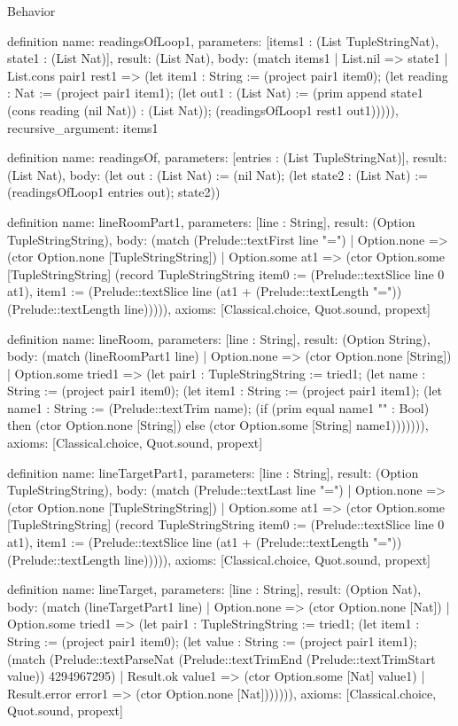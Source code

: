 \begin{lexlean}{Behavior}
\begin{semanticmodule}
definition{
  name: readingsOfLoop1,
  parameters: [items1 : (List TupleStringNat), state1 : (List Nat)],
  result: (List Nat),
  body: (match items1
    | List.nil => state1
    | List.cons pair1 rest1 => (let item1 : String := (project pair1 item0); (let reading : Nat := (project pair1 item1); (let out1 : (List Nat) := (prim append state1 (cons reading (nil Nat)) : (List Nat)); (readingsOfLoop1 rest1 out1))))),
  recursive_argument: items1
}

definition{
  name: readingsOf,
  parameters: [entries : (List TupleStringNat)],
  result: (List Nat),
  body: (let out : (List Nat) := (nil Nat); (let state2 : (List Nat) := (readingsOfLoop1 entries out); state2))
}

definition{
  name: lineRoomPart1,
  parameters: [line : String],
  result: (Option TupleStringString),
  body: (match (Prelude::textFirst line "=")
    | Option.none => (ctor Option.none [TupleStringString])
    | Option.some at1 => (ctor Option.some [TupleStringString] (record TupleStringString {item0 := (Prelude::textSlice line 0 at1), item1 := (Prelude::textSlice line (at1 + (Prelude::textLength "=")) (Prelude::textLength line))}))),
  axioms: [Classical.choice, Quot.sound, propext]
}

definition{
  name: lineRoom,
  parameters: [line : String],
  result: (Option String),
  body: (match (lineRoomPart1 line)
    | Option.none => (ctor Option.none [String])
    | Option.some tried1 => (let pair1 : TupleStringString := tried1; (let name : String := (project pair1 item0); (let item1 : String := (project pair1 item1); (let name1 : String := (Prelude::textTrim name); (if (prim equal name1 "" : Bool) then (ctor Option.none [String]) else (ctor Option.some [String] name1))))))),
  axioms: [Classical.choice, Quot.sound, propext]
}

definition{
  name: lineTargetPart1,
  parameters: [line : String],
  result: (Option TupleStringString),
  body: (match (Prelude::textLast line "=")
    | Option.none => (ctor Option.none [TupleStringString])
    | Option.some at1 => (ctor Option.some [TupleStringString] (record TupleStringString {item0 := (Prelude::textSlice line 0 at1), item1 := (Prelude::textSlice line (at1 + (Prelude::textLength "=")) (Prelude::textLength line))}))),
  axioms: [Classical.choice, Quot.sound, propext]
}

definition{
  name: lineTarget,
  parameters: [line : String],
  result: (Option Nat),
  body: (match (lineTargetPart1 line)
    | Option.none => (ctor Option.none [Nat])
    | Option.some tried1 => (let pair1 : TupleStringString := tried1; (let item1 : String := (project pair1 item0); (let value : String := (project pair1 item1); (match (Prelude::textParseNat (Prelude::textTrimEnd (Prelude::textTrimStart value)) 4294967295)
      | Result.ok value1 => (ctor Option.some [Nat] value1)
      | Result.error error1 => (ctor Option.none [Nat])))))),
  axioms: [Classical.choice, Quot.sound, propext]
}


\end{semanticmodule}
\end{lexlean}

